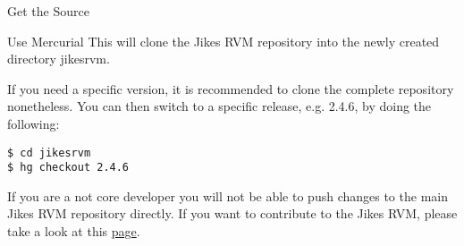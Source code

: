 \begin{section}{Get the Source}
\begin{subsection}{Use Mercurial}
This will clone the Jikes RVM repository into the newly created directory jikesrvm.

If you need a specific version, it is recommended to clone the complete repository nonetheless. You can then switch to a specific release, e.g. 2.4.6, by doing the following:

\begin{lstlisting}
$ cd jikesrvm
$ hg checkout 2.4.6
\end{lstlisting}

If you are a not core developer you will not be able to push changes to the main Jikes RVM repository directly. If you want to contribute to the Jikes RVM, please take a look at this \href{http://www.jikesrvm.org/Contributions/}{page}.

\end{subsection}

\end{section}
